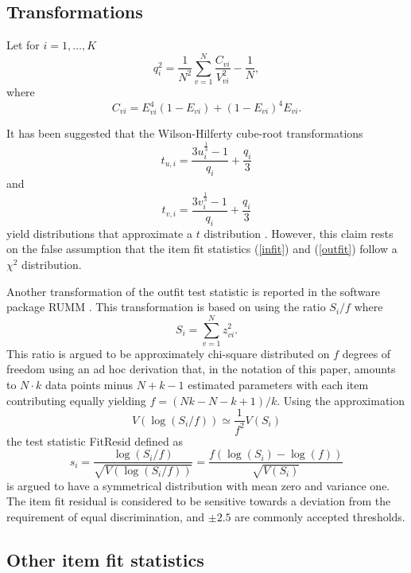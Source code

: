 \documentclass[11pt,a4paper]{article}
\begin{document}
\subsection{Transformations}

Let for $i=1,\ldots,K$
$$
q_i^2 = \frac{1}{N^2} \sum_{v=1}^N \frac{C_{vi}}{V_{vi}^2} - \frac1N,
$$
where
$$
C_{vi} = E_{vi}^4 (1 - E_{vi}) + (1-E_{vi})^4 E_{vi}.
$$

It has been suggested that the Wilson-Hilferty \citeyear{Wilson-Hilferty-1931} cube-root transformations
\begin{equation}\label{wilson-hilferty-OUT}
t_{u,i} = \frac{3u_i^{\frac{1}{3}} - 1}{q_i} + \frac{q_i}{3}
\end{equation}
and
\begin{equation}\label{wilson-hilferty-IN}
t_{v,i} = \frac{3v_i^{\frac{1}{3}} - 1}{q_i} + \frac{q_i}{3}
\end{equation}
yield distributions that approximate a $t$ distribution \cite[Table 5.4a, p.100]{Wright-Masters-1982}. However, this claim rests on the false assumption that the item fit statistics (\ref{infit}) and (\ref{outfit}) follow a $\chi^2$ distribution. 

Another transformation of the outfit test statistic is reported in the software package RUMM \cite{Andrich-Sheridan-Luo-et-al-2010}. This transformation is based on using the ratio $S_i/f$ where
\begin{equation}
S_i = \sum_{v = 1}^N z_{vi}^2.
\label{S}
\end{equation}
This ratio is argued to be approximately chi-square distributed on $f$ degrees of freedom using an ad hoc derivation that, in the notation of this paper, amounts to $N\cdot k$ data points minus $N+k-1$ estimated parameters with each item contributing equally yielding $f=(Nk-N-k+1)/k$. Using the approximation
\begin{equation}
V(\log(S_i/f))\simeq\frac1{f^2}{V(S_i)}
\end{equation}
the test statistic FitResid defined as 
\begin{equation}
s_i=\frac{\log(S_i/f)}{\sqrt{V(\log(S_i/f))}}
=\frac{f(\log(S_i)-\log(f))}{\sqrt{V(S_i)}}
\label{FitResid}
\end{equation}
is argued to have a symmetrical distribution with mean zero and variance one. The item fit residual is considered to be sensitive towards a deviation from the requirement of equal discrimination, and $\pm2.5$ are commonly accepted thresholds. 

\subsection{Other item fit statistics}
\label{sec:also-fit-stat}
\end{document}
